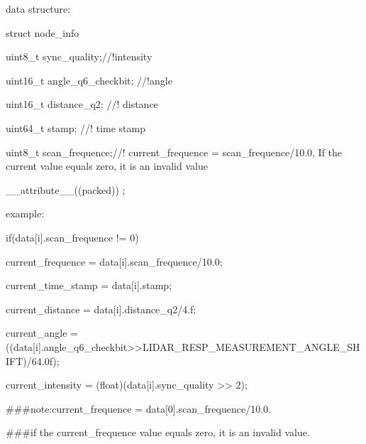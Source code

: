 data structure\+: \begin{DoxyVerb}struct node_info {

   uint8_t    sync_quality;//!intensity

   uint16_t   angle_q6_checkbit; //!angle

   uint16_t   distance_q2; //! distance

   uint64_t   stamp; //! time stamp

   uint8_t    scan_frequence;//! current_frequence = scan_frequence/10.0, If the current value equals zero, it is an invalid value

} __attribute__((packed)) ;
\end{DoxyVerb}


example\+: \begin{DoxyVerb}if(data[i].scan_frequence != 0) {

    current_frequence = data[i].scan_frequence/10.0;
}

current_time_stamp = data[i].stamp;

current_distance = data[i].distance_q2/4.f;

current_angle = ((data[i].angle_q6_checkbit>>LIDAR_RESP_MEASUREMENT_ANGLE_SHIFT)/64.0f);

current_intensity = (float)(data[i].sync_quality >> 2);

###note:current_frequence = data[0].scan_frequence/10.0.

###if the current_frequence value equals zero, it is an invalid value.
\end{DoxyVerb}


